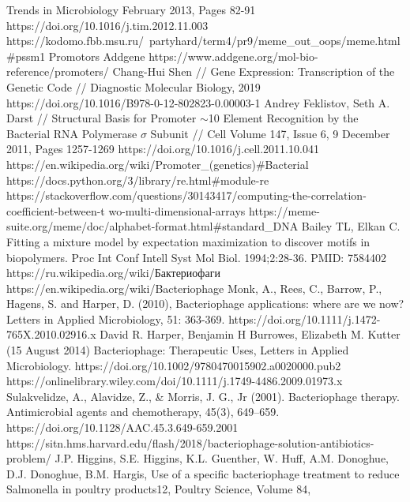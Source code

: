 \documentclass[14pt]{extarticle}
\begin{document}
\begin{thebibliography}{9}
    Trends in Microbiology February 2013, Pages 82-91 https://doi.org/10.1016/j.tim.2012.11.003
     https://kodomo.fbb.msu.ru/~partyhard/term4/pr9/meme\_out\_oops/meme.html\#pssm1
     Promotors Addgene https://www.addgene.org/mol-bio-reference/promoters/
     Chang-Hui Shen // Gene Expression: Transcription of the Genetic Code // Diagnostic Molecular 
    Biology, 2019 https://doi.org/10.1016/B978-0-12-802823-0.00003-1
     Andrey Feklistov,  Seth A. Darst // Structural Basis for Promoter $\sim$10 Element Recognition by the 
    Bacterial RNA Polymerase $\sigma$ Subunit // Cell Volume 147, Issue 6, 9 December 2011, Pages 1257-1269 
    https://doi.org/10.1016/j.cell.2011.10.041
     https://en.wikipedia.org/wiki/Promoter\_(genetics)\#Bacterial
     https://docs.python.org/3/library/re.html\#module-re
     https://stackoverflow.com/questions/30143417/computing-the-correlation-coefficient-between-t
    wo-multi-dimensional-arrays
     https://meme-suite.org/meme/doc/alphabet-format.html\#standard\_DNA
     Bailey TL, Elkan C. Fitting a mixture model by expectation maximization to discover motifs in 
    biopolymers. Proc Int Conf Intell Syst Mol Biol. 1994;2:28-36. PMID: 7584402
     https://ru.wikipedia.org/wiki/Бактериофаги
     https://en.wikipedia.org/wiki/Bacteriophage
     Monk, A., Rees, C., Barrow, P., Hagens, S. and Harper, D. (2010), Bacteriophage applications: 
    where are we now? Letters in Applied Microbiology, 51: 363-369. https://doi.org/10.1111/j.1472-765X.2010.02916.x
     David R. Harper, Benjamin H Burrowes, Elizabeth M. Kutter (15 August 2014) Bacteriophage: 
    Therapeutic Uses, Letters in Applied Microbiology.  https://doi.org/10.1002/9780470015902.a0020000.pub2
     https://onlinelibrary.wiley.com/doi/10.1111/j.1749-4486.2009.01973.x
     Sulakvelidze, A., Alavidze, Z., \& Morris, J. G., Jr (2001). Bacteriophage therapy. 
    Antimicrobial agents and chemotherapy, 45(3), 649–659. https://doi.org/10.1128/AAC.45.3.649-659.2001
     https://sitn.hms.harvard.edu/flash/2018/bacteriophage-solution-antibiotics-problem/
     J.P. Higgins, S.E. Higgins, K.L. Guenther, W. Huff, A.M. Donoghue, D.J. Donoghue, B.M. Hargis, 
    Use of a specific bacteriophage treatment to reduce Salmonella in poultry products12, Poultry Science, Volume 84, 

\end{thebibliography}
\end{document}
